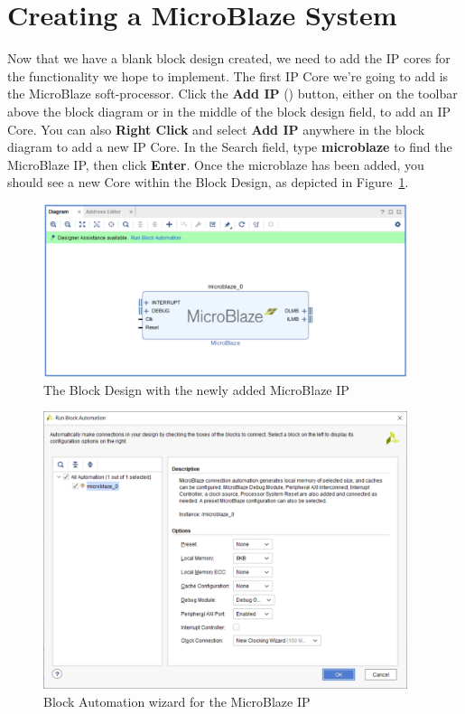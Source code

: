 \documentclass[11pt]{article}
\begin{document}
\section{Creating a MicroBlaze System}
\label{sec:adding_cores}
Now that we have a blank block design created, we need to add the IP cores for the functionality we hope to implement. The first IP Core we're going to add is the MicroBlaze soft-processor. Click the \textbf{Add IP}
()
button, either on the toolbar above the block diagram or in the middle of the block design field, to add an IP Core. You can also \textbf{Right Click} and select \textbf{Add IP} anywhere in the block diagram to add a new IP Core. In the Search field, type \textbf{microblaze} to find the MicroBlaze IP, then click \textbf{Enter}. Once the microblaze has been added, you should see a new Core within the Block Design, as depicted in Figure~\ref{fig:just_mb}.

\begin{figure}[h]
    \centering
    \includegraphics[width=0.95\textwidth]{images/just_mb.png}
    \caption{The Block Design with the newly added MicroBlaze IP}
    \label{fig:just_mb}
\end{figure}

\begin{figure}[!h]
    \centering
    \includegraphics[width=0.95\textwidth]{images/block_auto.png}
    \caption{Block Automation wizard for the MicroBlaze IP}
    \label{fig:block_auto}
\end{figure}
\end{document}
